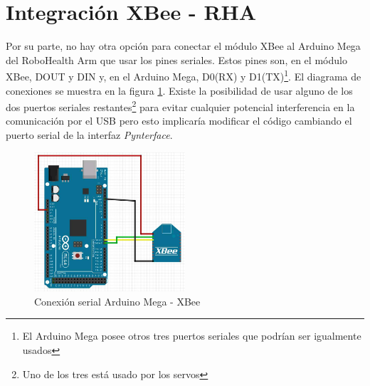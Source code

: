 \section{Integración XBee - RHA}

Por su parte, no hay otra opción para conectar el módulo XBee al Arduino Mega del RoboHealth Arm que usar los pines seriales. Estos pines son, en el módulo XBee, DOUT y DIN y, en el Arduino Mega, D0(RX) y D1(TX)\footnote{El Arduino Mega posee otros tres puertos seriales que podrían ser igualmente usados}. El diagrama de conexiones se muestra en la figura \ref{fig:AMegaXBserial}. Existe la posibilidad de usar alguno de los dos puertos seriales restantes\footnote{Uno de los tres está usado por los servos} para evitar cualquier potencial interferencia en la comunicación por el USB pero esto implicaría modificar el código cambiando el puerto serial de la interfaz \textit{Pynterface}.

\begin{figure}[hbt]
\centering
\includegraphics[width=0.5\textwidth]{figuras/AMegaXBserial.png}
\caption{Conexión serial Arduino Mega - XBee}
\label{fig:AMegaXBserial}
\end{figure}